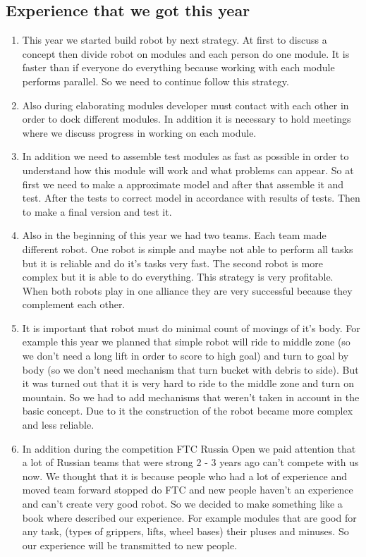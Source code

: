 \subsection{Experience that we got this year}
\begin{enumerate}
	\item This year we started build robot by next strategy. At first to discuss a concept then divide robot on modules and each person do one module. It is faster than if everyone do everything because working with each module performs parallel. So we need to continue follow this strategy.
	\item Also during elaborating modules developer must contact with each other in order to dock different modules. In addition it is necessary to hold meetings where we discuss progress in working on each module.
	\item In addition we need to assemble test modules as fast as possible in order to understand how this module will work and what problems can appear. So at first we need to make a approximate model and after that assemble it and test. After the tests to correct model in accordance with results of tests. Then to make a final version and test it.
	\item Also in the beginning of this year we had two teams. Each team made different robot. One robot is simple and maybe not able to perform all tasks but it is reliable and do it's tasks very fast. The second robot is more complex but it is able to do everything. This strategy is very profitable. When both robots play in one alliance they are very successful because they complement each other.
	\item It is important that robot must do minimal count of movings of it's body. For example this year we planned that simple robot will ride to middle zone (so we don't need a long lift in order to score to high goal) and turn to goal by body (so we don't need mechanism that turn bucket with debris to side). But it was turned out that it is very hard to ride to the middle zone and turn on mountain. So we had to add mechanisms that weren't taken in account in the basic concept. Due to it the construction of the robot became more complex and less reliable.
	\item In addition during the competition FTC Russia Open we paid attention that a lot of Russian teams that were strong 2 - 3 years ago can't compete with us now. We thought that it is because people who had a lot of experience and moved team forward stopped do FTC and new people haven't an experience and can't create very good robot. So we decided to make something like a book where described our experience. For example modules that are good for any task, (types of grippers, lifts, wheel bases) their pluses and minuses. So our experience will be transmitted to new people.  
\end{enumerate}